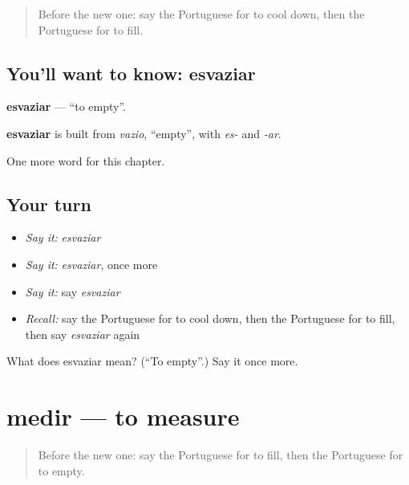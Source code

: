 \label{lesson:PT-C202-esvaziar}



\begin{quote}
Before the new one: say the Portuguese for to cool down, then the Portuguese for to fill.
\end{quote}

\subsection*{You'll want to know: esvaziar}
\textbf{esvaziar} — \textquotedblleft{}to empty\textquotedblright{}.

\begin{cousinweb}
\textbf{esvaziar} is built from \emph{vazio}, \textquotedblleft{}empty\textquotedblright{}, with \emph{es-} and \emph{-ar}.
\end{cousinweb}

\begin{grammarlens}[title={What you've built}]
One more word for this chapter.
\end{grammarlens}

\subsection*{Your turn}
\begin{itemize}
\raggedright
  \item \emph{Say it:} \emph{esvaziar}
  \item \emph{Say it:} \emph{esvaziar}, once more
  \item \emph{Say it:} say \emph{esvaziar}
  \item \emph{Recall:} say the Portuguese for to cool down, then the Portuguese for to fill, then say \emph{esvaziar} again
\end{itemize}

\begin{tcolorbox}[breakable,colback=teal!4,colframe=teal!35!black,title={Before you move on}]
What does esvaziar mean? (\textquotedblleft{}To empty\textquotedblright{}.) Say it once more.
\end{tcolorbox}
\section[medir]{medir — to measure}

\label{lesson:PT-C202-medir}



\begin{quote}
Before the new one: say the Portuguese for to fill, then the Portuguese for to empty.
\end{quote}

